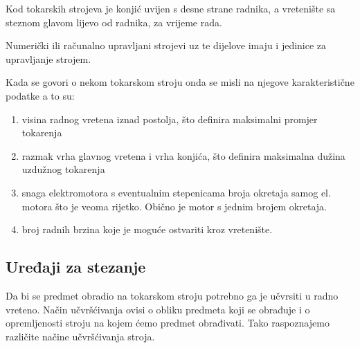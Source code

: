 \documentclass[a4paper,12pt]{article}
\numberwithin{figure}{section}
\begin{document}
Kod tokarskih strojeva je konjić uvijen s desne strane radnika, a vretenište sa steznom glavom lijevo od radnika, za vrijeme rada.\par
Numerički ili računalno upravljani strojevi uz te dijelove imaju i jedinice za upravljanje strojem. \par
Kada se govori o nekom tokarskom stroju onda se misli na njegove karakteristične podatke a to su:
\begin{enumerate}
\item visina radnog vretena iznad postolja, što definira maksimalni promjer tokarenja
\item razmak vrha glavnog vretena i vrha konjića, što definira maksimalna dužina uzdužnog tokarenja
\item snaga elektromotora s eventualnim stepenicama broja okretaja samog el. motora što je veoma rijetko. Obično je motor s jednim brojem okretaja.
\item broj radnih brzina koje je moguće ostvariti kroz vretenište.
\end{enumerate}
\subsection{Uređaji za stezanje}
Da bi se predmet obradio na tokarskom stroju potrebno ga je učvrsiti u radno vreteno. Način učvršćivanja ovisi o obliku predmeta koji se obrađuje i o opremljenosti stroju na kojem ćemo predmet obrađivati. Tako raspoznajemo različite načine učvršćivanja stroja.
\clearpage
\end{document}
